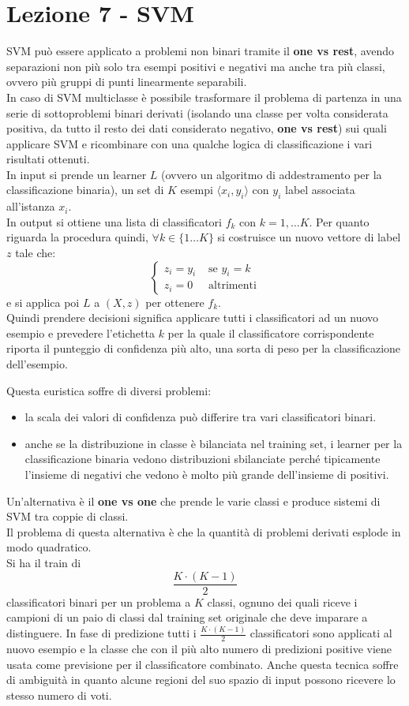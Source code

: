 \section{Lezione 7 - SVM}
SVM può essere applicato a problemi non binari tramite il \textbf{one vs rest}, avendo separazioni non più solo tra esempi positivi e negativi ma anche tra più classi, ovvero più gruppi di punti linearmente separabili.\\
In caso di SVM multiclasse è possibile trasformare il problema di partenza in una serie di sottoproblemi binari derivati (isolando una classe per volta considerata positiva, da tutto il resto dei dati considerato negativo,  \textbf{one vs rest}) sui quali applicare SVM e ricombinare con una qualche logica di classificazione i vari risultati ottenuti.\\
In input si prende un learner $L$ (ovvero un algoritmo di addestramento per la classificazione binaria), un set di $K$ esempi $\langle x_i, y_i \rangle$ con $y_i$ label associata all’istanza $x_i$.\\
In output si ottiene una lista di classificatori $f_k$ con $k=1,\ldots K$.
Per quanto riguarda la procedura quindi, $\forall k\in \{1\ldots K\}$ si costruisce un nuovo vettore di label $z$ tale che: 
$$\begin{cases}
    z_i=y_i&\mbox{ se } y_i=k\\
    z_i=0&\mbox{ altrimenti}
\end{cases}$$ e si applica poi $L$ a $(X,z)$ per ottenere $f_k$.\\
Quindi prendere decisioni significa applicare tutti i classificatori ad un nuovo esempio e prevedere l’etichetta $k$ per la quale il classificatore corrispondente riporta il punteggio di confidenza più alto, una sorta di peso per la classificazione dell’esempio.

Questa euristica soffre di diversi problemi:
\begin{itemize}
    \item la scala dei valori di confidenza può differire tra vari classificatori binari.
    \item anche se la distribuzione in classe è bilanciata nel training set, i learner per la classificazione binaria vedono distribuzioni sbilanciate perché tipicamente l’insieme di negativi che vedono è molto più grande dell’insieme di positivi.
\end{itemize}

Un’alternativa è il \textbf{one vs one} che prende le varie classi e produce sistemi di SVM tra coppie di classi. \\
Il problema di questa alternativa è che la quantità di problemi derivati esplode in modo quadratico.\\
Si ha il train di $$\frac{K\cdot (K-1)}{2}$$ classificatori binari per un problema a $K$ classi, ognuno dei quali riceve i campioni di un paio di classi dal training set originale che deve imparare a distinguere.
In fase di predizione tutti i $\frac{K\cdot (K-1)}{2}$ classificatori sono applicati al nuovo esempio e la classe che con il più alto numero di predizioni positive viene usata come previsione per il classificatore combinato. 
Anche questa tecnica soffre di ambiguità in quanto alcune regioni del suo spazio di input possono ricevere lo stesso numero di voti.